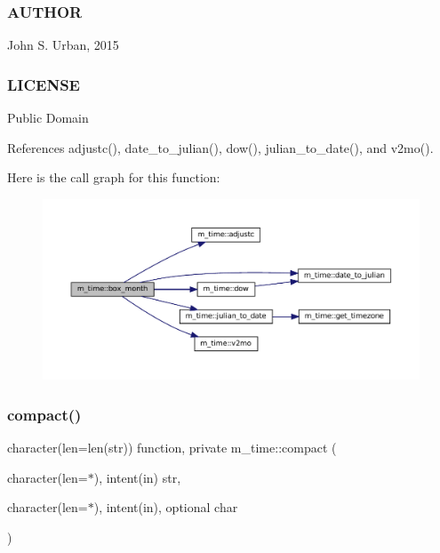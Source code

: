 \subsubsection*{A\+U\+T\+H\+OR}

John S. Urban, 2015 \subsubsection*{L\+I\+C\+E\+N\+SE}

Public Domain 

References adjustc(), date\+\_\+to\+\_\+julian(), dow(), julian\+\_\+to\+\_\+date(), and v2mo().

Here is the call graph for this function\+:\nopagebreak
\begin{figure}[H]
\begin{center}
\leavevmode
\includegraphics[width=350pt]{namespacem__time_a0fe7540912df30d3578f3c469413aea8_cgraph}
\end{center}
\end{figure}
\mbox{\label{namespacem__time_a7dd8bfae3ed8ba85bf4de75bf120fe89}} 
\subsubsection{\texorpdfstring{compact()}{compact()}}
{\footnotesize\ttfamily character(len=len(str)) function, private m\+\_\+time\+::compact (\begin{DoxyParamCaption}\item[{character(len=$\ast$), intent(in)}]{str,  }\item[{character(len=$\ast$), intent(in), optional}]{char }\end{DoxyParamCaption})\hspace{0.3cm}{\ttfamily [private]}}



